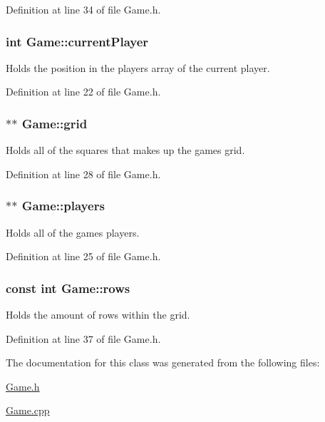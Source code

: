 Definition at line 34 of file Game.\-h.

\hypertarget{classGame_af57daa2f1aef9f264c18b462f8294e52}{
\subsubsection[{current\-Player}]{\setlength{\rightskip}{0pt plus 5cm}int Game\-::current\-Player\hspace{0.3cm}{\ttfamily [protected]}}}\label{classGame_af57daa2f1aef9f264c18b462f8294e52}


Holds the position in the players array of the current player. 



Definition at line 22 of file Game.\-h.

\hypertarget{classGame_a44fda9d5235865323c59d95b1f59b459}{
\subsubsection[{grid}]{$\ast$$\ast$ Game\-::grid\hspace{0.3cm}{\ttfamily [protected]}}}\label{classGame_a44fda9d5235865323c59d95b1f59b459}


Holds all of the squares that makes up the games grid. 



Definition at line 28 of file Game.\-h.

\hypertarget{classGame_ad82f617ca44c8996333c7f41c410a56b}{
\subsubsection[{players}]{$\ast$$\ast$ Game\-::players\hspace{0.3cm}{\ttfamily [protected]}}}\label{classGame_ad82f617ca44c8996333c7f41c410a56b}


Holds all of the games players. 



Definition at line 25 of file Game.\-h.

\hypertarget{classGame_ae882486dec6d9507bbef7f44aaf07db5}{
\subsubsection[{rows}]{\setlength{\rightskip}{0pt plus 5cm}const int Game\-::rows\hspace{0.3cm}{\ttfamily [protected]}}}\label{classGame_ae882486dec6d9507bbef7f44aaf07db5}


Holds the amount of rows within the grid. 



Definition at line 37 of file Game.\-h.



The documentation for this class was generated from the following files\-:\begin{DoxyCompactItemize}
\item 
\hyperlink{Game_8h}{Game.\-h}\item 
\hyperlink{Game_8cpp}{Game.\-cpp}\end{DoxyCompactItemize}
